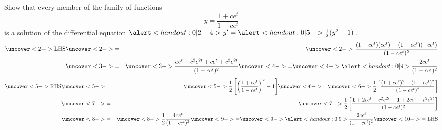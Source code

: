 \begin{frame}
\begin{example} %
Show that every member of the family of functions 
\abovedisplayskip=0pt
\belowdisplayskip=0pt
\[
y = \frac{1 + ce^t}{1-ce^t}
\]
is a solution of the differential equation $\alert<handout:0| 2-4>{y'} = \alert<handout:0| 5->{\frac{1}{2} (y^2 - 1)}$.
\abovedisplayskip=0pt
\belowdisplayskip=0pt
\begin{eqnarray*}
\uncover<2->{%
\textrm{LHS} %
}%
& \uncover<2->{ = } &%
\uncover<2->{%
\frac{(1-ce^t)(ce^t) - (1+ce^t)(-ce^t)}{(1-ce^t)^2}%
}\\%
& \uncover<3->{ = } &%
\uncover<3->{%
\frac{ce^t - c^2 e^{2t} + ce^t + c^2 e^{2t}}{(1-ce^t)^2}%
}  \uncover<4->{ = } \uncover<4->{%
\alert<handout:0| 9>{\frac{2ce^t}{(1-ce^t)^2}}%
}\\%
\end{eqnarray*}
\abovedisplayskip=0pt
\belowdisplayskip=0pt
\begin{eqnarray*}
\uncover<5->{%
\textrm{RHS} %
} 
& \uncover<5->{ = } & 
\uncover<5->{%
\frac{1}{2}\left[ \left( \frac{1+ce^t}{1-ce^t}\right)^2 - 1\right]
} \uncover<6->{ = } \uncover<6->{%
\frac{1}{2}\left[  \frac{(1+ce^t)^2 - (1-ce^t)^2}{(1-ce^t)^2} \right]
}\\ 
& \uncover<7->{ = } &
\uncover<7->{%
\frac{1}{2}\left[  \frac{1+2ce^t +c^2e^{2t} - 1 + 2ce^t - c^2e^{2t}}{(1-ce^t)^2} \right]
}\\
 & \uncover<8->{ = } & %
\uncover<8->{%
\frac{1}{2}  \frac{4ce^t }{(1-ce^t)^2} 
} \uncover<9->{ = } \uncover<9->{%
  \alert<handout:0| 9>{\frac{2ce^t }{(1-ce^t)^2}} \uncover<10->{= \textrm{LHS}}
}\\%
\end{eqnarray*}
\end{example}
\end{frame}
